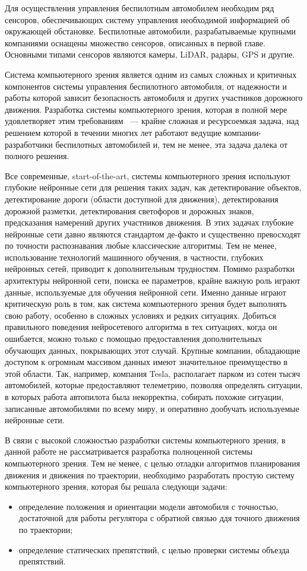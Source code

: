 Для осуществления управления беспилотным автомобилем необходим ряд сенсоров, обеспечивающих систему управления
необходимой информацией об окружающей обстановке. Беспилотные автомобили, разрабатываемые крупными компаниями
оснащены множество сенсоров, описанных в первой главе. Основными типами сенсоров являются камеры, LiDAR, радары,
GPS и другие.

Система компьютерного зрения является одним из самых сложных и критичных компонентов системы управления беспилотного
автомобиля, от надежности и работы которой зависит безопасность автомобиля и других участников дорожного движения.
Разработка системы компьютерного зрения, которая в полной мере удовлетворяет этим требованиям ~--- крайне сложная и
ресурсоемкая задача, над решением которой в течении многих лет работают ведущие компании-разработчики беспилотных
автомобилей и, тем не менее, эта задача далека от полного решения.

Все современные, start-of-the-art, системы компьютерного зрения используют глубокие нейронные сети для решения таких
задач, как детектирование объектов, детектирование дороги (области доступной для движения), детектирования дорожной
разметки, детектирования светофоров и дорожных знаков, предсказания намерений других участников движения. В этих задачах
глубокие нейронные сети давно являются стандартом де-факто и существенно превосходят по точности распознавания любые
классические алгоритмы. Тем не менее, использование технологий машинного обучения, в частности, глубоких нейронных
сетей, приводит к дополнительным трудностям. Помимо разработки архитектуры нейронной сети, поиска ее параметров, крайне
важную роль играют данные, используемые для обучения нейронной сети. Именно данные играют критическую роль в том, как
система компьютерного зрения будет выполнять свою работу, особенно в сложных условиях и редких ситуациях. Добиться
правильного поведения нейросетевого алгоритма в тех ситуациях, когда он ошибается, можно только с помощью предоставления
дополнительных обучающих данных, покрывающих этот случай. Крупные компании, обладающие доступом к огромным массивом
данных имеют значительное преимущество в этой области. Так, например, компания Tesla, располагает парком из сотен
тысяч автомобилей, которые предоставляют телеметрию, позволяя определять ситуации, в которых работа автопилота была
некорректна, собирать похожие ситуации, записанные автомобилями по всему миру, и оперативно дообучать используемые
нейронные сети.

В связи с высокой сложностью разработки системы компьютерного зрения, в данной работе не рассматривается разработка
полноценной системы компьютерного зрения. Тем не менее, с целью отладки алгоритмов планирования движения и движения
по траектории, необходимо разработать простую систему компьютерного зрения, которая бы решала следующи задачи:
\begin{itemize}
      \item определение положения и ориентации модели автомобиля с точностью, достаточной для работы регулятора с
            обратной связью ддя точного движения по траектории;
      \item определение статических препятствий, с целью проверки системы объезда препятствий.
\end{itemize}

